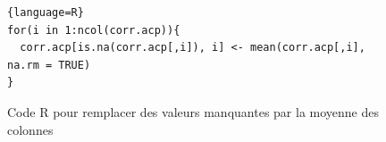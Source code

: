 \documentclass{article}
\begin{document}
\begin{table}[!ht]
\centering
\caption{Corrélation entre les variables quantitatives}\label{table1.3.1}
\end{table}


\begin{table}[!ht]
\caption{Tableau des p-value du test de Student en fonction du facteur diabète}
\centering


\label{table1.3_student}
\end{table}





\begin{figure}[!ht]
\centering
\begin{adjustbox}{width=12cm,height=0.7cm,keepaspectratio}
\begin{lstlisting}{language=R}
for(i in 1:ncol(corr.acp)){
  corr.acp[is.na(corr.acp[,i]), i] <- mean(corr.acp[,i], na.rm = TRUE)
}
\end{lstlisting}
\end{adjustbox}
\caption{Code R pour remplacer des valeurs manquantes par la moyenne des colonnes}
\label{code_R_na}
\end{figure}
\end{document}

